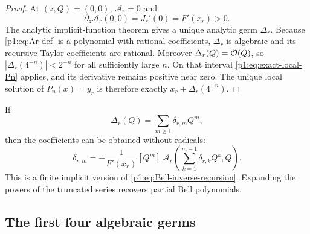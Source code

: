 \documentclass[11pt,oneside]{article}
\numberwithin{equation}{section}
\theoremstyle{definition}
\theoremstyle{remark}
\begin{document}
\begin{proof}
At $(z,Q)=(0,0)$, $\mathcal A_r=0$ and
\[
 \partial_z\mathcal A_r(0,0)=J_r'(0)=F'(x_r)>0.
\]
The analytic implicit-function theorem gives a unique analytic germ $\Delta_r$.
Because \eqref{p1:eq:Ar-def} is a polynomial with rational coefficients,
$\Delta_r$ is algebraic and its recursive Taylor coefficients are rational.
Moreover $\Delta_r(Q)=\mathcal O(Q)$, so
$|\Delta_r(4^{-n})|<2^{-n}$ for all sufficiently large $n$.  On that interval
\eqref{p1:eq:exact-local-Pn} applies, and its derivative remains positive near zero.
The unique local solution of $P_n(x)=y_r$ is therefore exactly
$x_r+\Delta_r(4^{-n})$.
\end{proof}

If
\begin{equation}
 \Delta_r(Q)=\sum_{m\ge1}\delta_{r,m}Q^m,
 \label{p1:eq:Delta-series}
\end{equation}
then the coefficients can be obtained without radicals:
\begin{equation}
 \boxed{
 \delta_{r,m}=-\frac1{F'(x_r)}[Q^m]\,
 \mathcal A_r\!\left(\sum_{k=1}^{m-1}\delta_{r,k}Q^k,Q\right).}
 \label{p1:eq:Delta-recursion}
\end{equation}
This is a finite implicit version of \eqref{p1:eq:Bell-inverse-recursion}.  Expanding the
powers of the truncated series recovers partial Bell polynomials.

\subsection{The first four algebraic germs}
\end{document}
